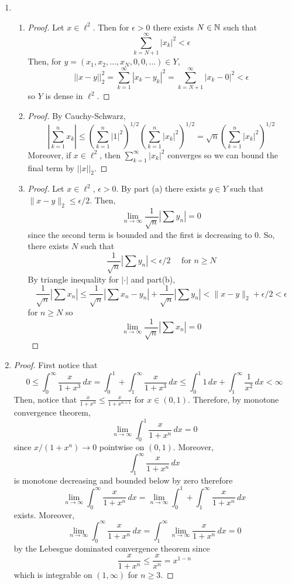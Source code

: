 \begin{enumerate}
\item \begin{enumerate}
	\item \begin{proof}
	Let $x \in \ell^2$. Then for $\epsilon >0$ there exists $N \in \mathbb{N}$ such that
		\[ \sum_{k=N+1}^\infty |x_k|^2 < \epsilon \]
	Then, for $y=(x_1,x_2,\ldots,x_N,0,0,\ldots) \in Y$,
		\[ ||x-y||_2^2 = \sum_{k=1}^\infty |x_k-y_k|^2 = \sum_{k=N+1}^\infty |x_k-0|^2 < \epsilon \]
	so $Y$ is dense in $\ell^2$.
	\end{proof}
	\item \begin{proof}
	By Cauchy-Schwarz,
		\[ \left| \sum_{k=1}^n x_k \right| \le \left( \sum_{k=1}^n |1|^2 \right)^{1/2} \left( \sum_{k=1}^n |x_k|^2\right)^{1/2} = \sqrt{n}\left( \sum_{k=1}^n |x_k|^2\right)^{1/2} \]
	Moreover, if $x \in \ell^2$, then $\sum_{k=1}^\infty |x_k|^2$ converges so we can bound the final term by $||x||_2$.
	\end{proof}

	\item \begin{proof}
		Let $x \in \ell^2$, $\epsilon>0$. By part (a) there exists $y \in Y$ such that $\| x-y\|_2 \le \epsilon/2$. Then,
			\[ \lim_{n \to \infty} \dfrac{1}{\sqrt{n}} \left|\sum y_n\right| =0\]
		since the second term is bounded and the first is decreasing to $0$. So, there exists $N$ such that
			\[ \dfrac{1}{\sqrt{n}} \left|\sum y_n\right| <\epsilon/2 \quad \mbox{ for } n \ge N \]
		By triangle inequality for $|\cdot |$ and part(b),
			\[ \dfrac{1}{\sqrt{n}} \left|\sum x_n \right| \le \dfrac{1}{\sqrt{n}} \left|\sum x_n-y_n \right| + \dfrac{1}{\sqrt{n}} \left|\sum y_n \right| < \|x-y\|_2 + \epsilon/2 < \epsilon \]
		for $n \ge N$ so 
			\[ \lim_{n \to \infty} \dfrac{1}{\sqrt{n}} \left|\sum x_n \right| =0\]
	\end{proof}
\end{enumerate}


\item \begin{proof}
First notice that 
	\[ 0 \le \int_0^\infty \dfrac{x}{1+x^3} \, dx = \int_0^1 + \int_1^\infty \dfrac{x}{1+x^3} \, dx \le \int_0^1 1 \, dx + \int_1^\infty \dfrac{1}{x^2} \, dx < \infty \]
Then, notice that $\tfrac{x}{1+x^n} \le \tfrac{x}{1+x^{n+1}}$ for $x \in (0,1)$. Therefore, by monotone convergence theorem, 
	\[ \lim_{n\to \infty} \int_0^1 \dfrac{x}{1+x^n} \, dx = 0 \]
since $x/(1+x^n) \to 0$ pointwise on $(0,1)$. Moreover, 
	\[ \int_1^\infty \dfrac{x}{1+x^n} \, dx \]
is monotone decreasing and bounded below by zero therefore
	\[ \lim_{n \to \infty} \int_0^\infty \dfrac{x}{1+x^n} \, dx = \lim_{n \to \infty} \int_0^1 + \int_1^\infty \dfrac{x}{1+x^n} \, dx\]
exists. Moreover,
	\[ \lim_{n\to \infty} \int_0^\infty \dfrac{x}{1+x^n} \, dx = \int_1^\infty \lim_{n\to\infty}\dfrac{x}{1+x^n} \, dx = 0 \]
by the Lebesgue dominated convergence theorem since
	\[ \dfrac{x}{1+x^n} \le \dfrac{x}{x^n} = x^{1-n} \]
which is integrable on $(1,\infty)$ for $n \ge 3$.
\end{proof}


\end{enumerate}
